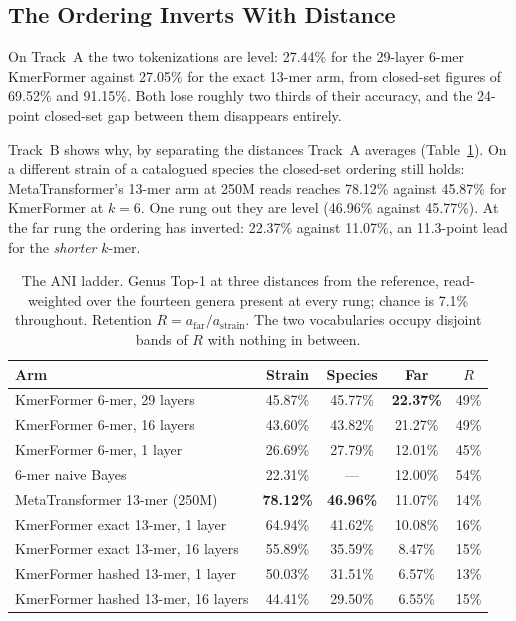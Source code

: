\subsection{The Ordering Inverts With Distance}

On Track~A the two tokenizations are level: 27.44\% for the 29-layer 6-mer KmerFormer against 27.05\% for the exact 13-mer arm, from closed-set figures of 69.52\% and 91.15\%. Both lose roughly two thirds of their accuracy, and the 24-point closed-set gap between them disappears entirely.

Track~B shows why, by separating the distances Track~A averages (Table~\ref{tab:ladder}). On a different strain of a catalogued species the closed-set ordering still holds: MetaTransformer's 13-mer arm at 250M reads reaches 78.12\% against 45.87\% for KmerFormer at $k=6$. One rung out they are level (46.96\% against 45.77\%). At the far rung the ordering has inverted: 22.37\% against 11.07\%, an 11.3-point lead for the \emph{shorter} $k$-mer.

\begin{table}[htbp]
    \centering
    \small
    \caption{The ANI ladder. Genus Top-1 at three distances from the reference, read-weighted over the fourteen genera present at every rung; chance is 7.1\% throughout. Retention $R = a_{\text{far}}/a_{\text{strain}}$. The two vocabularies occupy disjoint bands of $R$ with nothing in between.}
    \label{tab:ladder}
    \begin{tabular}{lcccc}
        \toprule
        \textbf{Arm} & \textbf{Strain} & \textbf{Species} & \textbf{Far} & \textbf{$R$} \\
        \midrule
        KmerFormer 6-mer, 29 layers        & 45.87\% & 45.77\% & \textbf{22.37\%} & 49\% \\
        KmerFormer 6-mer, 16 layers        & 43.60\% & 43.82\% & 21.27\% & 49\% \\
        KmerFormer 6-mer, 1 layer          & 26.69\% & 27.79\% & 12.01\% & 45\% \\
        6-mer naive Bayes                  & 22.31\% & --- & 12.00\% & 54\% \\
        \midrule
        MetaTransformer 13-mer (250M)      & \textbf{78.12\%} & \textbf{46.96\%} & 11.07\% & 14\% \\
        KmerFormer exact 13-mer, 1 layer   & 64.94\% & 41.62\% & 10.08\% & 16\% \\
        KmerFormer exact 13-mer, 16 layers & 55.89\% & 35.59\% & 8.47\% & 15\% \\
        KmerFormer hashed 13-mer, 1 layer  & 50.03\% & 31.51\% & 6.57\% & 13\% \\
        KmerFormer hashed 13-mer, 16 layers& 44.41\% & 29.50\% & 6.55\% & 15\% \\
        \bottomrule
    \end{tabular}
\end{table}

